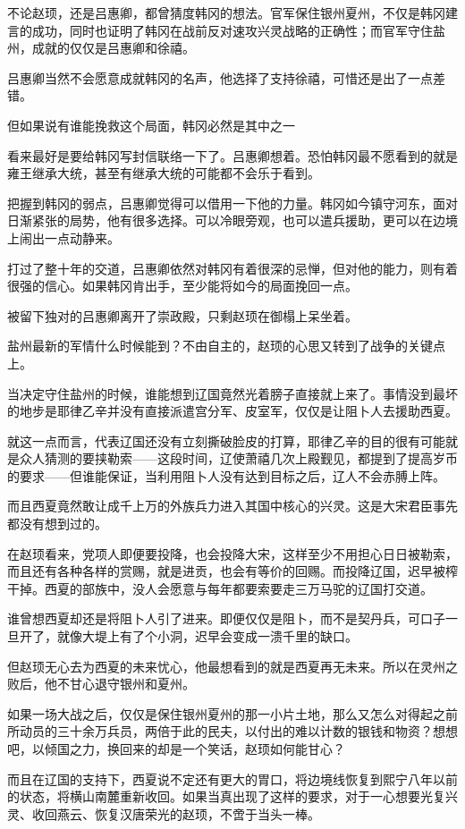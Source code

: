 不论赵顼，还是吕惠卿，都曾猜度韩冈的想法。官军保住银州夏州，不仅是韩冈建言的成功，同时也证明了韩冈在战前反对速攻兴灵战略的正确性；而官军守住盐州，成就的仅仅是吕惠卿和徐禧。

吕惠卿当然不会愿意成就韩冈的名声，他选择了支持徐禧，可惜还是出了一点差错。

但如果说有谁能挽救这个局面，韩冈必然是其中之一

看来最好是要给韩冈写封信联络一下了。吕惠卿想着。恐怕韩冈最不愿看到的就是雍王继承大统，甚至有继承大统的可能都不会乐于看到。

把握到韩冈的弱点，吕惠卿觉得可以借用一下他的力量。韩冈如今镇守河东，面对日渐紧张的局势，他有很多选择。可以冷眼旁观，也可以遣兵援助，更可以在边境上闹出一点动静来。

打过了整十年的交道，吕惠卿依然对韩冈有着很深的忌惮，但对他的能力，则有着很强的信心。如果韩冈肯出手，至少能将如今的局面挽回一点。

被留下独对的吕惠卿离开了崇政殿，只剩赵顼在御榻上呆坐着。

盐州最新的军情什么时候能到？不由自主的，赵顼的心思又转到了战争的关键点上。

当决定守住盐州的时候，谁能想到辽国竟然光着膀子直接就上来了。事情没到最坏的地步是耶律乙辛并没有直接派遣宫分军、皮室军，仅仅是让阻卜人去援助西夏。

就这一点而言，代表辽国还没有立刻撕破脸皮的打算，耶律乙辛的目的很有可能就是众人猜测的要挟勒索——这段时间，辽使萧禧几次上殿觐见，都提到了提高岁币的要求——但谁能保证，当利用阻卜人没有达到目标之后，辽人不会赤膊上阵。

而且西夏竟然敢让成千上万的外族兵力进入其国中核心的兴灵。这是大宋君臣事先都没有想到过的。

在赵顼看来，党项人即便要投降，也会投降大宋，这样至少不用担心日日被勒索，而且还有各种各样的赏赐，就是进贡，也会有等价的回赐。而投降辽国，迟早被榨干掉。西夏的部族中，没人会愿意与每年都要索要走三万马驼的辽国打交道。

谁曾想西夏却还是将阻卜人引了进来。即便仅仅是阻卜，而不是契丹兵，可口子一旦开了，就像大堤上有了个小洞，迟早会变成一溃千里的缺口。

但赵顼无心去为西夏的未来忧心，他最想看到的就是西夏再无未来。所以在灵州之败后，他不甘心退守银州和夏州。

如果一场大战之后，仅仅是保住银州夏州的那一小片土地，那么又怎么对得起之前所动员的三十余万兵员，两倍于此的民夫，以付出的难以计数的银钱和物资？想想吧，以倾国之力，换回来的却是一个笑话，赵顼如何能甘心？

而且在辽国的支持下，西夏说不定还有更大的胃口，将边境线恢复到熙宁八年以前的状态，将横山南麓重新收回。如果当真出现了这样的要求，对于一心想要光复兴灵、收回燕云、恢复汉唐荣光的赵顼，不啻于当头一棒。

